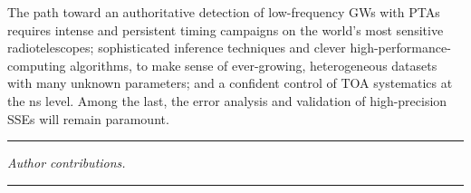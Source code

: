 \documentclass{aastex63}
\begin{document}
The path toward an authoritative detection of low-frequency GWs with PTAs requires intense and persistent timing campaigns on the world's most sensitive radiotelescopes; 
sophisticated inference techniques and clever high-performance-computing algorithms, to make sense of ever-growing, heterogeneous datasets with many unknown parameters; and a confident control of TOA systematics at the ns level. Among the last, the error analysis and validation of high-precision SSEs will remain paramount.

\begin{center}
\rule{0.25\columnwidth}{.4pt}
\end{center}

\emph{Author contributions.} 
\\



\begin{center}
\rule{0.25\columnwidth}{.4pt}
\end{center}



{}



\end{document}
